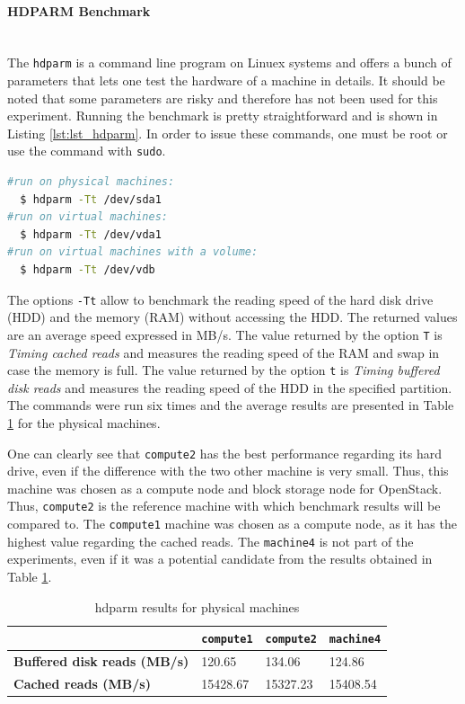 \paragraph{HDPARM Benchmark}\mbox{}\\
The \texttt{hdparm} is a command line program on Linuex systems and offers a bunch of parameters that lets one test the hardware of a machine in details. 
It should be noted that some parameters are risky and therefore has not been used for this experiment. 
Running the benchmark is pretty straightforward and is shown in Listing \ref{lst:lst_hdparm}.
In order to issue these commands, one must be root or use the command with \texttt{sudo}.

{
\singlespacing
\begin{lstlisting}[frame=single,language=bash,caption={hdparm commands},label={lst:lst_hdparm}]
#run on physical machines:
  $ hdparm -Tt /dev/sda1
#run on virtual machines:
  $ hdparm -Tt /dev/vda1
#run on virtual machines with a volume:
  $ hdparm -Tt /dev/vdb
\end{lstlisting}
}

The options \texttt{-Tt} allow to benchmark the reading speed of the hard disk drive (HDD) and the memory (RAM) without accessing the HDD. 
The returned values are an average speed expressed in MB/s. 
The value returned by the option \texttt{T} is \textit{Timing cached reads} and measures the reading speed of the RAM and swap in case the memory is full. 
The value returned by the option \texttt{t} is \textit{Timing buffered disk reads} and measures the reading speed of the HDD in the specified partition.
The commands were run six times and the average results are presented in Table \ref{table:hdparm_res_PM} for the physical machines. 

One can clearly see that \texttt{compute2} has the best performance regarding its hard drive, even if the difference with the two other machine is very small. 
Thus, this machine was chosen as a compute node and block storage node for OpenStack.
Thus, \texttt{compute2} is the reference machine with which benchmark results will be compared to.
The \texttt{compute1} machine was chosen as a compute node, as it has the highest value regarding the cached reads.
The \texttt{machine4} is not part of the experiments, even if it was a potential candidate from the results obtained in Table \ref{table:hdparm_res_PM}.

\begin{table}[h]
	\centering
	\begin{tabular}{|m{6cm}|m{2.5cm}|m{2.5cm}|m{2.5cm}|}
		\hline
		& 
		\texttt{compute1} & %
		\texttt{compute2} & %
		\texttt{machine4} \\
		\hline
		\textbf{Buffered disk reads (MB/s)} & 
		120.65 & 
		134.06 & 
		124.86 \\
		\hline
		\textbf{Cached reads (MB/s)} &  
		15428.67 & 
		15327.23 & 
		15408.54 \\
		\hline
	\end{tabular}
	\caption{hdparm results for physical machines}
	\label{table:hdparm_res_PM}
\end{table}

